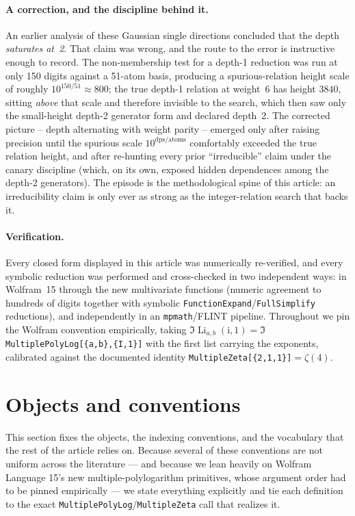 \documentclass[11pt]{article}
\DeclareMathOperator{\Li}{Li}
\newcommand{\iu}{\mathrm{i}}
\theoremstyle{plain}
\theoremstyle{remark}
\begin{document}
\paragraph{A correction, and the discipline behind it.} An earlier analysis of these Gaussian single directions concluded that the depth \emph{saturates at~2}. That claim was wrong, and the route to the error is instructive enough to record. The non-membership test for a depth-1 reduction was run at only 150 digits against a 51-atom basis, producing a spurious-relation height scale of roughly $10^{150/51}\approx 800$; the true depth-1 relation at weight~6 has height $3840$, sitting \emph{above} that scale and therefore invisible to the search, which then saw only the small-height depth-2 generator form and declared depth~2. The corrected picture -- depth alternating with weight parity -- emerged only after raising precision until the spurious scale $10^{\mathrm{dps}/\mathrm{atoms}}$ comfortably exceeded the true relation height, and after re-hunting every prior ``irreducible'' claim under the canary discipline (which, on its own, exposed hidden dependences among the depth-2 generators). The episode is the methodological spine of this article: an irreducibility claim is only ever as strong as the integer-relation search that backs it.

\paragraph{Verification.} Every closed form displayed in this article was numerically re-verified, and every symbolic reduction was performed and cross-checked in two independent ways: in Wolfram~15 through the new multivariate functions (numeric agreement to hundreds of digits together with symbolic \texttt{FunctionExpand}/\texttt{FullSimplify} reductions), and independently in an \texttt{mpmath}/\mbox{FLINT} pipeline. Throughout we pin the Wolfram convention empirically, taking $\Im\Li_{a,b}(\iu,1)=\Im$\,\texttt{MultiplePolyLog[\{a,b\},\allowbreak\{I,1\}]} with the first list carrying the exponents, calibrated against the documented identity \texttt{MultipleZeta[\{2,1,1\}]}${}=\zeta(4)$.


\section{Objects and conventions}

This section fixes the objects, the indexing conventions, and the vocabulary that the rest of the article relies on. Because several of these conventions are not uniform across the literature --- and because we lean heavily on Wolfram Language 15's new multiple-polylogarithm primitives, whose argument order had to be pinned empirically --- we state everything explicitly and tie each definition to the exact \texttt{MultiplePolyLog}/\texttt{MultipleZeta} call that realizes it.
\end{document}
